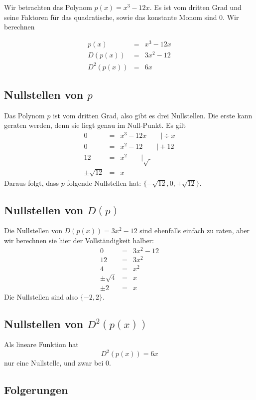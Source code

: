 Wir betrachten das Polynom $p(x) = x^3 -12x$. Es ist vom dritten Grad und seine Faktoren für das quadratische, sowie das konstante Monom sind 0. Wir berechnen

\begin{eqnarray*}
p(x) &=& x^3 -12x \\
D(p(x)) &=& 3x^2 -12 \\
D^2(p(x)) &=& 6x
\end{eqnarray*}


\subsection{Nullstellen von $p$}\label{sec:nsp}

Das Polynom $p$ ist vom dritten Grad, also gibt es drei Nullstellen. Die erste kann geraten werden, denn sie liegt genau im Null-Punkt. Es gilt
\begin{eqnarray*}
0 &=& x^3 -12x \qquad \vert \div x \\
0 &=& x^2 - 12 \qquad \vert +12 \\
12 &=& x^2 \qquad \vert \sqrt{.} \\
\pm \sqrt{12} &=& x
\end{eqnarray*}
Daraus folgt, dass $p$ folgende Nullstellen hat: $\{-\sqrt{12},0,+\sqrt{12}\}$.

\subsection{Nullstellen von $D(p)$}\label{sec:nsd1}

Die Nullstellen von $D(p(x))=3x^2-12$ sind ebenfalls einfach zu raten, aber wir berechnen sie hier der Vollständigkeit halber:
\begin{eqnarray*}
0 &=& 3x^2-12 \\
12 &=& 3x^2 \\
4 &=& x^2 \\
\pm \sqrt{4} &=& x \\
\pm 2 &=& x
\end{eqnarray*}
Die Nullstellen sind also $\{-2,2\}$. 

\subsection{Nullstellen von $D^2(p(x))$}\label{sec:nsd2}

Als lineare Funktion hat 
\[
D^2(p(x)) = 6x
\]
nur eine Nullstelle, und zwar bei $0$.

\subsection{Folgerungen}

